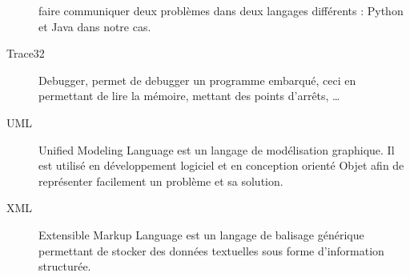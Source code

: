 \begin{description}
	faire communiquer deux problèmes dans deux langages différents : Python et Java dans notre cas.
\item[Trace32] Debugger, permet de debugger un programme embarqué, ceci en permettant de lire la mémoire, mettant des points d'arrêts, \ldots
\item[UML] Unified Modeling Language est un langage de modélisation graphique. Il est utilisé en développement logiciel et en conception orienté Objet afin de
	représenter facilement un problème et sa solution.
\item[XML] Extensible Markup Language est un langage de balisage générique permettant de stocker des données textuelles sous forme d'information structurée.
\end{description}

